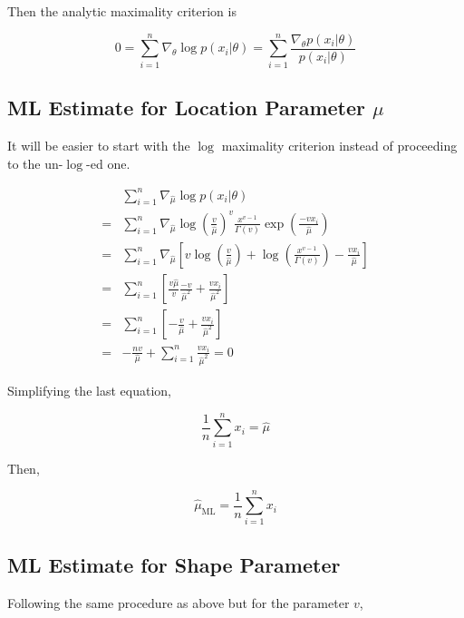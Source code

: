 \documentclass[11pt]{scrartcl}
\begin{document}
Then the analytic maximality criterion is

\[0 = \sum_{i=1}^n \nabla_\theta \log{p(x_i|\theta)} = \sum_{i=1}^n \frac{\nabla_\theta p(x_i|\theta)}{p(x_i|\theta)}\]

\subsection{ML Estimate for Location Parameter $\mu$}

It will be easier to start with the $\log$ maximality criterion instead of proceeding to the un-$\log$-ed one.

\begin{align*}
&\sum_{i=1}^n \nabla_{\hat{\mu}} \log{p(x_i|\theta)} \\
= &\sum_{i=1}^n \nabla_{\hat{\mu}} \log{\left( \frac{v}{{\hat{\mu}}}\right)^v \frac{x^{v-1}}{\Gamma(v)} \exp{\left(\frac{-vx_i}{{\hat{\mu}}}\right)}} \\
= &\sum_{i=1}^n \nabla_{\hat{\mu}} \left[v\log{\left(\frac{v}{{\hat{\mu}}}\right)} + \log{\left( \frac{x^{v-1}}{\Gamma(v)}\right)} - \frac{vx_i}{{\hat{\mu}}} \right] \\
= &\sum_{i=1}^n \left[  \frac{v{\hat{\mu}}}{v}\frac{-v}{{\hat{\mu}}^2} + \frac{vx_i}{{\hat{\mu}}^2} \right] \\
= &\sum_{i=1}^n \left[ -\frac{v}{{\hat{\mu}}} + \frac{vx_i}{{\hat{\mu}}^2}\right] \\
= &-\frac{nv}{{\hat{\mu}}} + \sum_{i=1}^n \frac{vx_i}{{\hat{\mu}}^2} = 0
\end{align*}

Simplifying the last equation,

\[\frac{1}{n}\sum_{i=1}^n x_i = \hat{\mu}\]

Then,

\[\hat{\mu}_\mathrm{ML} = \frac{1}{n} \sum_{i=1}^n x_i\]

\subsection{ML Estimate for Shape Parameter}

Following the same procedure as above but for the parameter $v$,
\end{document}
